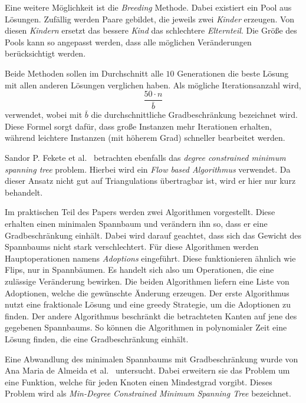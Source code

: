 Eine weitere Möglichkeit ist die \emph{Breeding} Methode.
Dabei existiert ein Pool aus Lösungen.
Zufällig werden Paare gebildet, die jeweils zwei \emph{Kinder} erzeugen.
Von diesen \emph{Kindern} ersetzt das bessere \emph{Kind} das schlechtere \emph{Elternteil}.
Die Größe des Pools kann so angepasst werden, dass alle möglichen Veränderungen berücksichtigt werden.

Beide Methoden sollen im Durchschnitt alle \(10\) Generationen die beste Lösung mit allen anderen Lösungen verglichen haben.
Als mögliche Iterationsanzahl wird,
\[
\frac{50 \cdot n}{\bar{b}}
\]
verwendet, wobei mit \(\bar{b}\) die durchschnittliche Gradbeschränkung bezeichnet wird.
Diese Formel sorgt dafür, dass große Instanzen mehr Iterationen erhalten, während leichtere Instanzen (mit höherem Grad) schneller bearbeitet werden.


Sandor P. Fekete et al.~\cite{A_network-flow_technique_for_finding_low-weight_bounded-degree_spanning_trees} betrachten ebenfalls das \emph{degree constrained minimum spanning tree} problem.
Hierbei wird ein \emph{Flow based Algorithmus} verwendet.
Da dieser Ansatz nicht gut auf Triangulations übertragbar ist, wird er hier nur kurz behandelt.

Im praktischen Teil des Papers werden zwei Algorithmen vorgestellt.
Diese erhalten einen minimalen Spannbaum und verändern ihn so, dass er eine Gradbeschränkung einhält.
Dabei wird darauf geachtet, dass sich das Gewicht des Spannbaums nicht stark verschlechtert.
Für diese Algorithmen werden Hauptoperationen namens \emph{Adoptions} eingeführt.
Diese funktionieren ähnlich wie Flips, nur in Spannbäumen.
Es handelt sich also um Operationen, die eine zulässige Veränderung bewirken.
Die beiden Algorithmen liefern eine Liste von Adoptionen, welche die gewünschte Änderung erzeugen.
Der erste Algorithmus nutzt eine fraktionale Lösung und eine greedy Strategie, um die Adoptionen zu finden.
Der andere Algorithmus beschränkt die betrachteten Kanten auf jene des gegebenen Spannbaums.
So können die Algorithmen in polynomialer Zeit eine Lösung finden, die eine Gradbeschränkung einhält.

\label{sec:einleitung:min-degree}
Eine Abwandlung des minimalen Spannbaums mit Gradbeschränkung wurde von Ana Maria de Almeida et al.~\cite{Min-degree_constrained_minimum_spanning_tree_problem:_complexity_properties_and_formulations} untersucht.
Dabei erweitern sie das Problem um eine Funktion, welche für jeden Knoten einen Mindestgrad vorgibt.
Dieses Problem wird als \emph{Min-Degree Constrained Minimum Spanning Tree} bezeichnet.

